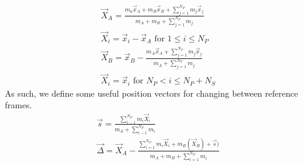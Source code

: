 \documentclass[manuscript]{aastex631}
\begin{document}
\begin{equation}
    \begin{split}
        \vec{X}_A = \frac{m_a\vec{x}_A+m_B\vec{x}_B+\sum_{j=1}^{N_P}m_j\vec{x}_j}{m_A+m_B+\sum_{j=1}^{N_P}m_j} \\
        \vec{X}_i = \vec{x}_i-\vec{x}_A \text{   for   } 1\leq i \leq N_P \\ 
        \vec{X}_B = \vec{x}_B-\frac{m_A\vec{x}_A+\sum_{j=1}^{N_P}m_j\vec{x}_j}{m_A+\sum_{j=1}^{N_P}m_j} \\
        \vec{X}_i = \vec{x}_i \text{   for   } N_P < i \leq N_P+N_S
     \end{split}
\label{positions}
\end{equation}
As such, we define some useful position vectors for changing between reference frames.
\begin{equation}
\begin{split}
    \vec{s} = \frac{\sum_{i-1}^{N_P}m_i\vec{X}_i}{m_A+\sum_{i-1}^{N_P}m_i}\\
    \vec{\Delta} = \vec{X}_A-\frac{\sum_{i=1}^{N_P}m_i\vec{X}_i+m_B(\vec{X}_B)+\vec{s})}{m_A+m_B+\sum_{i=1}^{N_P}m_i}
\end{split}
\end{equation}
\end{document}
